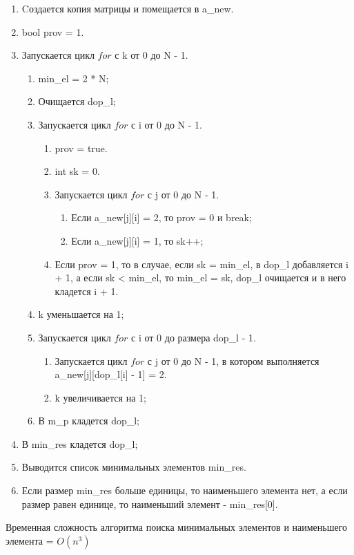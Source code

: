 \documentclass[bachelor, och, labwork]{shiza}
\begin{document}
	\begin{enumerate} 
		\item Cоздается копия матрицы и помещается в a\_new.
		\item bool prov = 1.
		\item Запускается цикл $for$ с k от 0 до N - 1.
		\begin{enumerate} 
		\item  min\_el = 2 * N;
		\item Очищается dop\_l;
		\item Запускается цикл $for$ с i от 0 до N - 1.
			\begin{enumerate} 
				\item prov = true.
				\item int sk = 0.
				\item Запускается цикл $for$ с j от 0 до N - 1.
					\begin{enumerate} 
						\item Если a\_new[j][i] = 2, то prov = 0 и break;
						\item Если a\_new[j][i] = 1, то sk++;
					\end{enumerate}
				\item Если prov = 1, то в случае, если sk = min\_el, в dop\_l добавляется i + 1, а если sk < min\_el, то min\_el = sk, dop\_l очищается и в него кладется i + 1.
			\end{enumerate}
		\item k уменьшается на 1;
		\item Запускается цикл $for$ с i от 0 до размера dop\_l - 1.
			\begin{enumerate}  
				\item Запускается цикл $for$ с j от 0 до N - 1, в котором выполняется a\_new[j][dop\_l[i] - 1] = 2.
				\item k увеличивается на 1;
			\end{enumerate}
		\item В m\_p кладется dop\_l;
		\end{enumerate}
		\item В min\_res кладется dop\_l;
		\item Выводится список минимальных элементов min\_res.
		\item Если размер min\_res больше единицы, то наименьшего элемента нет, а если размер равен единице, то наименьший элемент - min\_res[0].
	\end{enumerate} 

	Временная сложность алгоритма поиска минимальных элементов и наименьшего элемента = $O(n^3)$	
	
\end{document}

